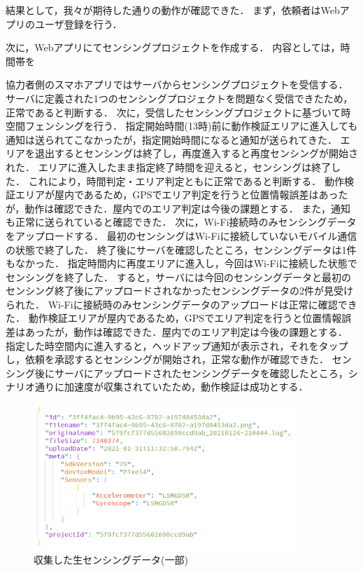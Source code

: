 結果として，我々が期待した通りの動作が確認できた．
まず，依頼者はWebアプリのユーザ登録を行う．

次に，Webアプリにてセンシングプロジェクトを作成する．
内容としては，時間帯を

協力者側のスマホアプリではサーバからセンシングプロジェクトを受信する．
サーバに定義された1つのセンシングプロジェクトを問題なく受信できたため，正常であると判断する．
次に，受信したセンシングプロジェクトに基づいて時空間フェンシングを行う．
指定開始時間(13時)前に動作検証エリアに進入しても通知は送られてこなかったが，指定開始時間になると通知が送られてきた．
エリアを退出するとセンシングは終了し，再度進入すると再度センシングが開始された．
エリアに進入したまま指定終了時間を迎えると，センシングは終了した．
これにより，時間判定・エリア判定ともに正常であると判断する．
動作検証エリアが屋内であるため，GPSでエリア判定を行うと位置情報誤差はあったが，動作は確認できた．屋内でのエリア判定は今後の課題とする．
また，通知も正常に送られていると確認できた．
次に，Wi-Fi接続時のみセンシングデータをアップロードする．
最初のセンシングはWi-Fiに接続していないモバイル通信の状態で終了した．
終了後にサーバを確認したところ，センシングデータは1件もなかった．
指定時間内に再度エリアに進入し，今回はWi-Fiに接続した状態でセンシングを終了した．
すると，サーバには今回のセンシングデータと最初のセンシング終了後にアップロードされなかったセンシングデータの2件が見受けられた．
Wi-Fiに接続時のみセンシングデータのアップロードは正常に確認できた．
動作検証エリアが屋内であるため，GPSでエリア判定を行うと位置情報誤差はあったが，動作は確認できた．屋内でのエリア判定は今後の課題とする．
指定した時空間内に進入すると，ヘッドアップ通知が表示され，それをタップし，依頼を承認するとセンシングが開始され，正常な動作が確認できた．
センシング後にサーバにアップロードされたセンシングデータを確認したところ，シナリオ通りに加速度が収集されていたため，動作検証は成功とする．

\begin{figure}[H]
  \centering
  \includegraphics[width=100mm]{sensingData.png}
  \caption{収集した生センシングデータ(一部)}
  \label{fig:2}
\end{figure}

